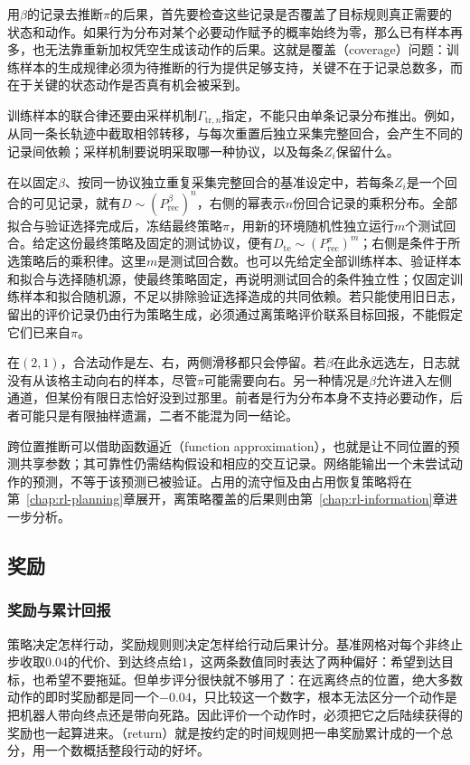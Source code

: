 用$\beta$的记录去推断$\pi$的后果，首先要检查这些记录是否覆盖了目标规则真正需要的状态和动作。如果行为分布对某个必要动作赋予的概率始终为零，那么已有样本再多，也无法靠重新加权凭空生成该动作的后果。这就是覆盖（coverage）问题：训练样本的生成规律必须为待推断的行为提供足够支持，关键不在于记录总数多，而在于关键的状态动作是否真有机会被采到。

训练样本的联合律还要由采样机制$\Gamma_{\mathrm{tr},n}$指定，不能只由单条记录分布推出。例如，从同一条长轨迹中截取相邻转移，与每次重置后独立采集完整回合，会产生不同的记录间依赖；采样机制要说明采取哪一种协议，以及每条$Z_i$保留什么。

在以固定$\beta$、按同一协议独立重复采集完整回合的基准设定中，若每条$Z_i$是一个回合的可见记录，就有$D\sim(P_{\mathrm{rec}}^\beta)^n$，右侧的幂表示$n$份回合记录的乘积分布。全部拟合与验证选择完成后，冻结最终策略$\pi$，用新的环境随机性独立运行$m$个测试回合。给定这份最终策略及固定的测试协议，便有$D_{\mathrm{te}}\sim(P_{\mathrm{rec}}^\pi)^m$；右侧是条件于所选策略后的乘积律。这里$m$是测试回合数。也可以先给定全部训练样本、验证样本和拟合与选择随机源，使最终策略固定，再说明测试回合的条件独立性；仅固定训练样本和拟合随机源，不足以排除验证选择造成的共同依赖。若只能使用旧日志，留出的评价记录仍由行为策略生成，必须通过离策略评价联系目标回报，不能假定它们已来自$\pi$。

在$(2,1)$，合法动作是左、右，两侧滑移都只会停留。若$\beta$在此永远选左，日志就没有从该格主动向右的样本，尽管$\pi$可能需要向右。另一种情况是$\beta$允许进入左侧通道，但某份有限日志恰好没到过那里。前者是行为分布本身不支持必要动作，后者可能只是有限抽样遗漏，二者不能混为同一结论。

跨位置推断可以借助函数逼近（function approximation），也就是让不同位置的预测共享参数；其可靠性仍需结构假设和相应的交互记录。网络能输出一个未尝试动作的预测，不等于该预测已被验证。占用的流守恒及由占用恢复策略将在第~\ref{chap:rl-planning}章展开，离策略覆盖的后果则由第~\ref{chap:rl-information}章进一步分析。

\subsection{奖励}
\label{sec:rl-overview-rewards}

\subsubsection{奖励与累计回报}
\label{sec:rl-overview-return}

策略决定怎样行动，奖励规则则决定怎样给行动后果计分。基准网格对每个非终止步收取$0.04$的代价、到达终点给$1$，这两条数值同时表达了两种偏好：希望到达目标，也希望不要拖延。但单步评分很快就不够用了：在远离终点的位置，绝大多数动作的即时奖励都是同一个$-0.04$，只比较这一个数字，根本无法区分一个动作是把机器人带向终点还是带向死路。因此评价一个动作时，必须把它之后陆续获得的奖励也一起算进来。（return）就是按约定的时间规则把一串奖励累计成的一个总分，用一个数概括整段行动的好坏。

